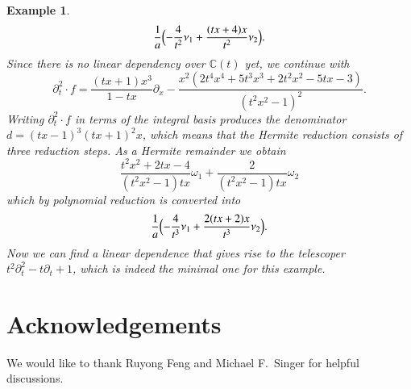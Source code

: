 \documentclass[final,1p,times,authoryear]{elsarticle}
\newtheorem{example}[theorem]{Example}
\newcommand{\bC}{ {\mathbb C}}
\begin{document}
\begin{example}
\[
  \frac1a \Bigl( -\frac{4}{t^2} \nu_1 + \frac{(tx+4)x}{t^2} \nu_2 \Bigr).
\]
Since there is no linear dependency over $\bC(t)$ yet, we continue with
\[
  \partial_t^2\cdot f =
  \frac{(tx+1)x^3}{1-tx} \partial_x -
  \frac{x^2(2t^4x^4+5t^3x^3+2t^2x^2-5tx-3)}{(t^2x^2-1)^2}.
\]
Writing $\partial_t^2\cdot f$ in terms of the integral basis produces the denominator
$d=(tx-1)^3(tx+1)^2x$, which means that the Hermite reduction consists of three
reduction steps. As a Hermite remainder we obtain
\[
  \frac{t^2x^2+2tx-4}{(t^2x^2-1)tx} \omega_1 + \frac{2}{(t^2x^2-1)tx} \omega_2
\]
which by polynomial reduction is converted into
\[
  \frac1a \Bigl( -\frac{4}{t^3} \nu_1 + \frac{2(tx+2)x}{t^3} \nu_2 \Bigr).
\]
Now we can find a linear dependence that gives rise to the telescoper
$t^2\partial_t^2-t\partial_t+1$, which is indeed the minimal one for this example.
\end{example}

\section*{Acknowledgements}

We would like to thank Ruyong Feng and Michael F.\ Singer for helpful discussions.



\end{document}
